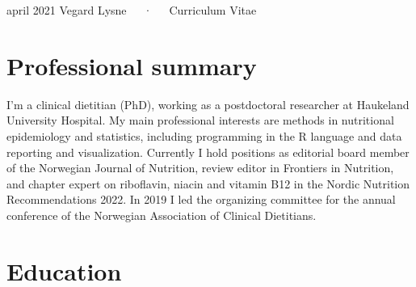 \documentclass[11pt, a4paper]{awesome-cv}
\begin{document}
\makecvheader

\makecvfooter
  {april 2021}
    {Vegard Lysne~~~·~~~Curriculum Vitae}
  {\thepage}





\hypertarget{professional-summary}{%
\section{Professional summary}\label{professional-summary}}

I'm a clinical dietitian (PhD), working as a postdoctoral researcher at
Haukeland University Hospital. My main professional interests are
methods in nutritional epidemiology and statistics, including
programming in the R language and data reporting and visualization.
Currently I hold positions as editorial board member of the Norwegian
Journal of Nutrition, review editor in Frontiers in Nutrition, and
chapter expert on riboflavin, niacin and vitamin B12 in the Nordic
Nutrition Recommendations 2022. In 2019 I led the organizing committee
for the annual conference of the Norwegian Association of Clinical
Dietitians.

\hypertarget{education}{%
\section{Education}\label{education}}

\begin{cventries}
\end{cventries}
\end{document}

